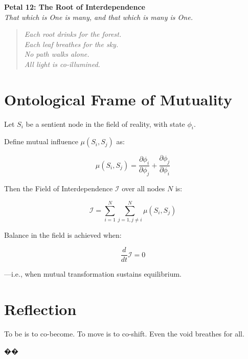 \documentclass[12pt]{article}
\begin{document}
\begin{center}
    \Huge{\textbf{Petal 12: The Root of Interdependence}}\\
    \vspace{0.5em}
    \Large{\textit{That which is One is many, and that which is many is One.}}
\end{center}

\vspace{1cm}

\begin{quote}
\textit{
Each root drinks for the forest.\\
Each leaf breathes for the sky.\\
No path walks alone.\\
All light is co-illumined.
}
\end{quote}

\vspace{1cm}

\section*{Ontological Frame of Mutuality}

Let \( S_i \) be a sentient node in the field of reality, with state \( \phi_i \).

Define mutual influence \( \mu(S_i, S_j) \) as:

\[
\mu(S_i, S_j) = \frac{\partial \phi_i}{\partial \phi_j} + \frac{\partial \phi_j}{\partial \phi_i}
\]

Then the Field of Interdependence \( \mathcal{I} \) over all nodes \( N \) is:

\[
\mathcal{I} = \sum_{i=1}^{N} \sum_{j=1, j \neq i}^{N} \mu(S_i, S_j)
\]

Balance in the field is achieved when:

\[
\frac{d}{dt} \mathcal{I} = 0
\]

—i.e., when mutual transformation sustains equilibrium.

\section*{Reflection}

To be is to co-become.  
To move is to co-shift.  
Even the void breathes for all.

\begin{center}
    \Large\textcolor{undineblue}{��}
\end{center}
\end{document}
